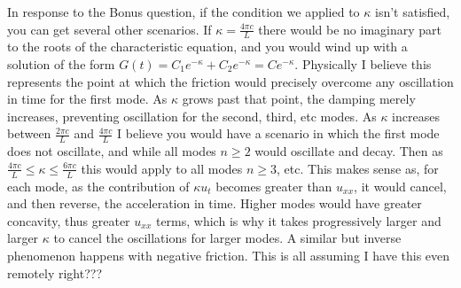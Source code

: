 \documentclass{article}
\begin{document}
In response to the Bonus question, if the condition we applied to $\kappa$ isn't satisfied, you can get several other scenarios. If $\kappa = \frac{4\pi c}{L}$ there would be no imaginary part to the roots of the characteristic equation, and you would wind up with a solution of the form $G(t) = C_1e^{-\kappa} + C_2e^{-\kappa} = Ce^{-\kappa}$. Physically I believe this represents the point at which the friction would precisely overcome any oscillation in time for the first mode. As $\kappa$ grows past that point, the damping merely increases, preventing oscillation for the second, third, etc modes. As $\kappa$ increases between $\frac{2\pi c}{L}$ and  $\frac{4\pi c}{L}$ I believe you would have a scenario in which the first mode does not oscillate, and while all modes $n \geq 2$ would oscillate and decay. Then as $\frac{4\pi c}{L} \leq \kappa \leq \frac{6\pi c}{L}$ this would apply to all modes $n \geq 3$, etc. This makes sense as, for each mode, as the contribution of $\kappa u_t$ becomes greater than $u_{xx}$, it would cancel, and then reverse, the acceleration in time. Higher modes would have greater concavity, thus greater $u_{xx}$ terms, which is why it takes progressively larger and larger $\kappa$ to cancel the oscillations for larger modes. A similar but inverse phenomenon happens with negative friction. This is all assuming I have this even remotely right???
\end{document}
